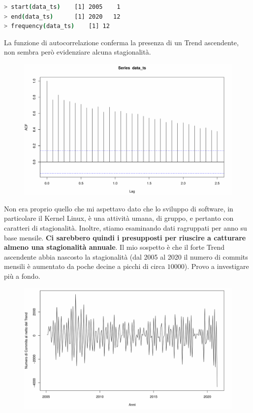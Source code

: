 \documentclass[11pt,a4paper]{article}
\begin{document}
\begin{lstlisting}[language=bash,basicstyle=\scriptsize,tabsize=2,frame = single]
> start(data_ts)	[1] 2005    1
> end(data_ts)		[1] 2020   12
> frequency(data_ts)	[1] 12
\end{lstlisting}
La funzione di autocorrelazione conferma la presenza di un Trend ascendente, non
sembra per\`o evidenziare alcuna stagionalit\`a.
\clearpage
\begin{figure}[H]
	\vspace{-1.5cm}
	\hspace{-0.5cm}
	\includegraphics[scale=0.63]{imgs/acf.pdf}
\end{figure}
\noindent
Non era proprio quello che mi aspettavo dato che lo sviluppo di software, in
particolare il Kernel Linux, \`e una attivit\`a umana, di gruppo, e pertanto con
caratteri di stagionalit\`a. Inoltre, stiamo esaminando dati ragruppati per anno
su base mensile. \textbf{Ci sarebbero quindi i presupposti per riuscire a
catturare almeno una stagionalit\`a annuale}. Il mio sospetto \`e che il forte
Trend ascendente abbia nascosto la stagionalit\`a (dal 2005 al 2020 il numero di
commits mensili \`e aumentato da poche decine a picchi di circa $10000$). Provo
a investigare pi\`u a fondo.
\vspace{-0.4cm}
\begin{figure}[H]
	\includegraphics[scale=0.6]{imgs/diff.pdf}
	\vspace{-0.9cm}
\end{figure}
\end{document}
